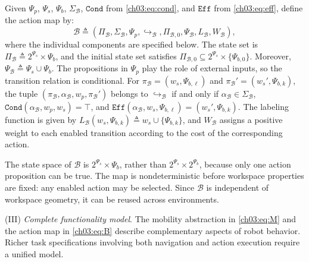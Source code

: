 \begin{definition}
Given $\Psi_p$, $\Psi_s$, $\Psi_b$, $\Sigma_{\mathcal{B}}$,
$\texttt{Cond}$ from \eqref{ch03:eq:cond}, and $\texttt{Eff}$ from
\eqref{ch03:eq:eff}, define the action map by:
\begin{equation}
\label{ch03:eq:B}
\mathcal{B} \triangleq
(\Pi_{\mathcal{B}}, \Sigma_{\mathcal{B}}, \Psi_p,
 \hookrightarrow_{\mathcal{B}}, \Pi_{\mathcal{B},0}, \Psi_{\mathcal{B}},
 L_{\mathcal{B}}, W_{\mathcal{B}}),
\end{equation}
where the individual components are specified below.
The state set is
$\Pi_{\mathcal{B}} \triangleq 2^{\Psi_s} \times \Psi_b$, and the initial state
set satisfies
$\Pi_{\mathcal{B},0} \subseteq 2^{\Psi_s} \times \{\Psi_{b,0}\}$. Moreover,
$\Psi_{\mathcal{B}} \triangleq \Psi_s \cup \Psi_b$. The propositions in
$\Psi_p$ play the role of external inputs, so the transition relation is
conditional. For
$\pi_{\mathcal{B}} = (w_s,\Psi_{b,\ell})$ and
$\pi_{\mathcal{B}}' = (w_s',\Psi_{b,k})$, the tuple
$(\pi_{\mathcal{B}}, \alpha_{\mathcal{B}}, w_p, \pi_{\mathcal{B}}')$ belongs
to $\hookrightarrow_{\mathcal{B}}$ if and only if
$\alpha_{\mathcal{B}} \in \Sigma_{\mathcal{B}}$,
$\texttt{Cond}(\alpha_{\mathcal{B}}, w_p, w_s)=\top$, and
$\texttt{Eff}(\alpha_{\mathcal{B}}, w_s, \Psi_{b,\ell})
= (w_s', \Psi_{b,k})$. The labeling function is given by
$L_{\mathcal{B}}(w_s,\Psi_{b,k}) \triangleq w_s \cup \{\Psi_{b,k}\}$, and
$W_{\mathcal{B}}$ assigns a positive weight to each enabled transition
according to the cost of the corresponding action.
\end{definition}


The state space of $\mathcal{B}$ is $2^{\Psi_s} \times \Psi_b$, rather than
$2^{\Psi_s} \times 2^{\Psi_b}$, because only one action proposition can be true.
The map is nondeterministic before workspace properties are fixed: any enabled
action may be selected.
Since $\mathcal{B}$ is independent of workspace
geometry, it can be reused across environments.

(III) \emph{Complete functionality model}.
The mobility abstraction in \eqref{ch03:eq:M} and the action map in
\eqref{ch03:eq:B} describe complementary aspects of robot behavior. Richer task
specifications involving both navigation and action execution require a unified
model.

